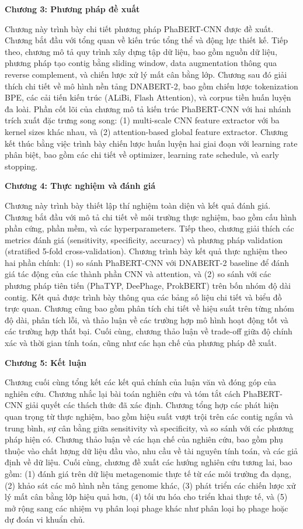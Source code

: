 \textbf{Chương 3: Phương pháp đề xuất}

Chương này trình bày chi tiết phương pháp PhaBERT-CNN được đề xuất. Chương bắt đầu với tổng quan về kiến trúc tổng thể và động lực thiết kế. Tiếp theo, chương mô tả quy trình xây dựng tập dữ liệu, bao gồm nguồn dữ liệu, phương pháp tạo contig bằng sliding window, data augmentation thông qua reverse complement, và chiến lược xử lý mất cân bằng lớp. Chương sau đó giải thích chi tiết về mô hình nền tảng DNABERT-2, bao gồm chiến lược tokenization BPE, các cải tiến kiến trúc (ALiBi, Flash Attention), và corpus tiền huấn luyện đa loài. Phần cốt lõi của chương mô tả kiến trúc PhaBERT-CNN với hai nhánh trích xuất đặc trưng song song: (1) multi-scale CNN feature extractor với ba kernel sizes khác nhau, và (2) attention-based global feature extractor. Chương kết thúc bằng việc trình bày chiến lược huấn luyện hai giai đoạn với learning rate phân biệt, bao gồm các chi tiết về optimizer, learning rate schedule, và early stopping.

\textbf{Chương 4: Thực nghiệm và đánh giá}

Chương này trình bày thiết lập thí nghiệm toàn diện và kết quả đánh giá. Chương bắt đầu với mô tả chi tiết về môi trường thực nghiệm, bao gồm cấu hình phần cứng, phần mềm, và các hyperparameters. Tiếp theo, chương giải thích các metrics đánh giá (sensitivity, specificity, accuracy) và phương pháp validation (stratified 5-fold cross-validation). Chương trình bày kết quả thực nghiệm theo hai phần chính: (1) so sánh PhaBERT-CNN với DNABERT-2 baseline để đánh giá tác động của các thành phần CNN và attention, và (2) so sánh với các phương pháp tiên tiến (PhaTYP, DeePhage, ProkBERT) trên bốn nhóm độ dài contig. Kết quả được trình bày thông qua các bảng số liệu chi tiết và biểu đồ trực quan. Chương cũng bao gồm phân tích chi tiết về hiệu suất trên từng nhóm độ dài, phân tích lỗi, và thảo luận về các trường hợp mô hình hoạt động tốt và các trường hợp thất bại. Cuối cùng, chương thảo luận về trade-off giữa độ chính xác và thời gian tính toán, cũng như các hạn chế của phương pháp đề xuất.

\textbf{Chương 5: Kết luận}

Chương cuối cùng tổng kết các kết quả chính của luận văn và đóng góp của nghiên cứu. Chương nhắc lại bài toán nghiên cứu và tóm tắt cách PhaBERT-CNN giải quyết các thách thức đã xác định. Chương tổng hợp các phát hiện quan trọng từ thực nghiệm, bao gồm hiệu suất vượt trội trên các contig ngắn và trung bình, sự cân bằng giữa sensitivity và specificity, và so sánh với các phương pháp hiện có. Chương thảo luận về các hạn chế của nghiên cứu, bao gồm phụ thuộc vào chất lượng dữ liệu đầu vào, nhu cầu về tài nguyên tính toán, và các giả định về dữ liệu. Cuối cùng, chương đề xuất các hướng nghiên cứu tương lai, bao gồm: (1) đánh giá trên dữ liệu metagenomic thực tế từ các môi trường đa dạng, (2) khảo sát các mô hình nền tảng genome khác, (3) phát triển các chiến lược xử lý mất cân bằng lớp hiệu quả hơn, (4) tối ưu hóa cho triển khai thực tế, và (5) mở rộng sang các nhiệm vụ phân loại phage khác như phân loại họ phage hoặc dự đoán vi khuẩn chủ.

